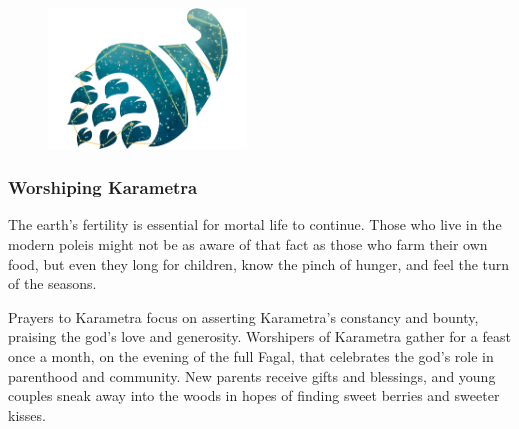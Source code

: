     \begin{figure}[b]
        \centering
        \includegraphics[width=0.47\textwidth]{02viphoger/img/10s_karametra.png}
    \end{figure}

    \subsubsection{Worshiping Karametra}
        The earth's fertility is essential for mortal life to continue.
        Those who live in the modern poleis might not be as aware of that fact as those who farm their own food, but even they long for children, know the pinch of hunger, and feel the turn of the seasons.

        Prayers to Karametra focus on asserting Karametra's constancy and bounty, praising the god's love and generosity.
        Worshipers of Karametra gather for a feast once a month, on the evening of the full Fagal, that celebrates the god's role in parenthood and community.
        New parents receive gifts and blessings, and young couples sneak away into the woods in hopes of finding sweet berries and sweeter kisses.

\pagebreak
